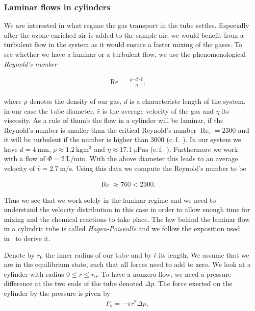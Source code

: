 \subsubsection{Laminar flows in cylinders}
\label{sec:cylinder}

We are interested in what regime the gas transport in the tube
settles. Especially after the ozone enriched air is added to the
sample air, we would benefit from a turbulent flow in the system as
it would ensure a faster mixing of the gases. To see whether we have
a laminar or a turbulent flow, we use the phenomenological \emph{Reynold's
number}

\begin{align*}
  \operatorname{Re} = \frac{\rho \cdot d \cdot \bar v}{\eta},
\end{align*}

where $\rho$ denotes the density of our gas, $d$ is a characteristc
length of the system, in our case the tube diameter, $\bar v$ is the
average velocity of the gas and $\eta$ its viscosity. As a rule of
thumb the flow in a cylinder will be laminar, if the Reynold's number
is smaller than the critical Reynold's number
$\operatorname{Re}_{\text{c}} = 2300$ and it will be turbulent if the
number is higher than $3000$ (c.\,f.~\cite{maschbau}). In our system
we have $d = \SI{4}{\milli\meter}$, $\rho \approx
\SI{1.2}{\kilo\gram\cubic\meter}$ and $\eta \approx
\SI{17.1}{\micro\pascal\second}$ (c.\,f.~\cite{maschbau}). Furthermore
we work with a flow of $\Phi = \SI{2}{\liter\per\minute}$. With the
above diameter this leads to an average velocity of $\bar v =
\SI{2.7}{\meter\per\second}$. Using this data we compute the Reynold's
number to be

\begin{align*}
  \operatorname{Re} \approx 760 < 2300.
\end{align*}

Thus we see that we work solely in the laminar regime and we need to
understand the velocity distribution in this case in order to allow
enough time for mixing and the chemical reactions to take place. The
law behind the laminar flow in a cylindric tube is called
\emph{Hagen-Poiseulle} and we follow the exposition used
in~\cite{gerthsen} to derive it.

Denote by $r_0$ the inner radius of our tube and by $l$ its length. We
assume that we are in the equilibrium state, such that all forces need
to add to zero. We look at a cylinder with radius $0 \leq r \leq
r_0$. To have a nonzero flow, we need a pressure difference at the two
ends of the tube denoted $\Delta p$. The force exerted on the cylinder
by the pressure is given by
\begin{align*}
  F_b = - \pi r^2 \Delta p,
\end{align*}

